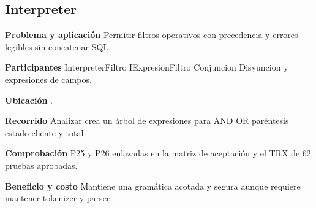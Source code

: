 \noindent\begin{minipage}{\linewidth}
\subsection{Interpreter}
\textbf{Problema y aplicación} Permitir filtros operativos con precedencia y errores legibles sin concatenar SQL.

\textbf{Participantes} InterpreterFiltro IExpresionFiltro Conjuncion Disyuncion y expresiones de campos.

\textbf{Ubicación} \href{https://github.com/Alan77-bot/LogiMarket360Alan/blob/68bda51063441415524ede51bdf61649ee9b4973/LogiMarket.Application/Reportes/InterpreterFiltro.cs#L12}{}.

\textbf{Recorrido} Analizar crea un árbol de expresiones para AND OR paréntesis estado cliente y total.


\textbf{Comprobación} P25 y P26 enlazadas en la matriz de aceptación y el TRX de 62 pruebas aprobadas.

\textbf{Beneficio y costo} Mantiene una gramática acotada y segura aunque requiere mantener tokenizer y parser.

\end{minipage}\par\smallskip
